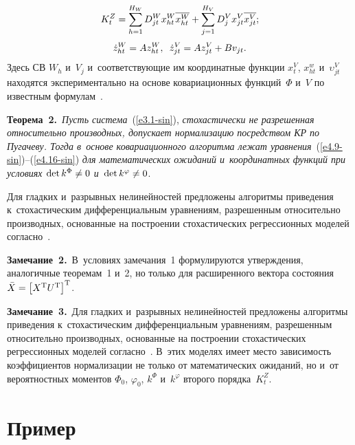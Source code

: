 \begin{multicols}{2}
    \noindent
\begin{equation}
K_t^Z =\sum\limits_{h=1}^{H_W} D_{jt}^W  x_{ht}^W\overline{x_{ht}^W} + 
    \sum\limits_{j=1}^{H_V} D_j^V x_{jt}^V \overline{x_{jt}^V};
    \label{e4.15-sin}
    \end{equation}
\begin{equation}
\dot z_{ht}^W =Az_{ht}^W,\enskip \dot z_{jt}^V = Az_{jt}^V +Bv_{jt}.
    \label{e4.16-sin}
\end{equation}
Здесь СВ  $W_h$ и~$V_j$ и~соответствующие им координатные функции $x_{t}^V$, $x_{ht}^w$ и~$\upsilon_{jt}^V$ 
находятся экспериментально на основе ковариационных функций~$\Phi$ и~$V$ по известным формулам~\cite{7-sin}.

\smallskip

\noindent
\textbf{Теорема~2.}\ \textit{Пусть сис\-те\-ма}~(\ref{e3.1-sin}), 
\textit{стохастически не разрешенная относительно производных, 
допускает нормализацию посредством КР по Пугачеву. Тогда 
в~основе ковариационного алгоритма лежат уравнения}~(\ref{e4.9-sin})--(\ref{e4.16-sin}) 
\textit{для математических ожиданий и~координатных функций при условиях  $\det k^\Phi \hm\ne 0$
и~$\det k^\varphi \hm\ne 0$}.
 
 \smallskip

Для гладких и~разрывных нелинейностей предложены алгоритмы приведения 
к~стохастическим дифференциальным уравнениям, разрешенным относительно производных, 
основанные на построении стохастических регрессионных моделей согласно~\cite{5-sin}.

\smallskip

\noindent
\textbf{Замечание~2.}\ В~условиях замечания~1 формулируются утверж\-де\-ния, аналогичные тео\-ре\-мам~1 и~2, 
но только для расширенного вектора состояния $\bar X \hm= \lk X^{\mathrm{T}}U^{\mathrm{T}}\rk^{\mathrm{T}}$.

\smallskip

\noindent
\textbf{Замечание~3.}\ Для гладких и~разрывных нелинейностей предложены алгоритмы приведения 
к~стохастическим дифференциальным уравнениям, разрешенным относительно производных, 
основанные на построении стохастических регрессионных моделей согласно~\cite{5-sin}. 
В~этих моделях имеет место зависимость коэффициентов нормализации не только от математических ожиданий, 
но и~от вероятностных моментов $\Phi_0$, $\varphi_0$, $k^\Phi$ и~$k^\varphi$ второго порядка~$K_t^Z$.

\section{Пример}


\end{multicols}
